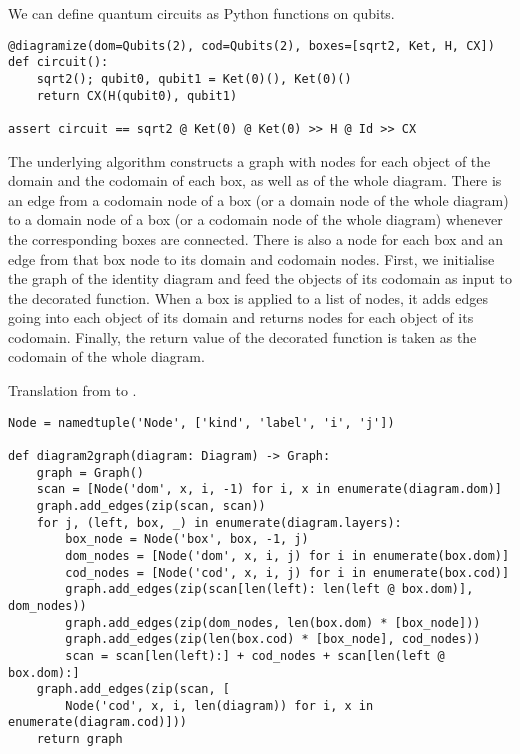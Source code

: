 \begin{example}
We can define quantum circuits as Python functions on qubits.

\begin{verbatim}
@diagramize(dom=Qubits(2), cod=Qubits(2), boxes=[sqrt2, Ket, H, CX])
def circuit():
    sqrt2(); qubit0, qubit1 = Ket(0)(), Ket(0)()
    return CX(H(qubit0), qubit1)

assert circuit == sqrt2 @ Ket(0) @ Ket(0) >> H @ Id >> CX
\end{verbatim}
\end{example}

The underlying algorithm constructs a graph with nodes for each object of the domain and the codomain of each box, as well as of the whole diagram.
There is an edge from a codomain node of a box (or a domain node of the whole diagram) to a domain node of a box (or a codomain node of the whole diagram) whenever the corresponding boxes are connected.
There is also a node for each box and an edge from that box node to its domain and codomain nodes.
First, we initialise the graph of the identity diagram and feed the objects of its codomain as input to the decorated function.
When a box is applied to a list of nodes, it adds edges going into each object of its domain and returns nodes for each object of its codomain.
Finally, the return value of the decorated function is taken as the codomain of the whole diagram.

\begin{python}\label{listing:diagram2graph}
{\normalfont Translation from  to .}

\begin{verbatim}
Node = namedtuple('Node', ['kind', 'label', 'i', 'j'])

def diagram2graph(diagram: Diagram) -> Graph:
    graph = Graph()
    scan = [Node('dom', x, i, -1) for i, x in enumerate(diagram.dom)]
    graph.add_edges(zip(scan, scan))
    for j, (left, box, _) in enumerate(diagram.layers):
        box_node = Node('box', box, -1, j)
        dom_nodes = [Node('dom', x, i, j) for i in enumerate(box.dom)]
        cod_nodes = [Node('cod', x, i, j) for i in enumerate(box.cod)]
        graph.add_edges(zip(scan[len(left): len(left @ box.dom)], dom_nodes))
        graph.add_edges(zip(dom_nodes, len(box.dom) * [box_node]))
        graph.add_edges(zip(len(box.cod) * [box_node], cod_nodes))
        scan = scan[len(left):] + cod_nodes + scan[len(left @ box.dom):]
    graph.add_edges(zip(scan, [
        Node('cod', x, i, len(diagram)) for i, x in enumerate(diagram.cod)]))
    return graph
\end{verbatim}
\end{python}

